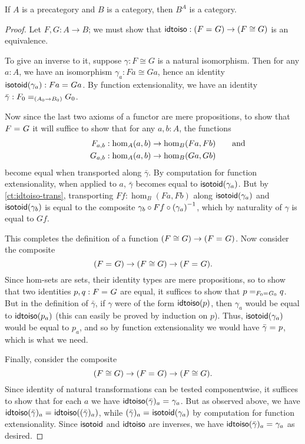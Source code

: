\begin{thm}\label{ct:functor-cat}
  If $A$ is a precategory and $B$ is a category, then $B^A$ is a category.
\end{thm}
\begin{proof}
  Let $F,G:A\to B$; we must show that $\idtoiso:(\id{F}{G}) \to (F\cong G)$ is an equivalence.

  To give an inverse to it, suppose $\gamma:F\cong G$ is a natural isomorphism.
  Then for any $a:A$, we have an isomorphism $\gamma_a:Fa \cong Ga$, hence an identity $\isotoid(\gamma_a):\id{Fa}{Ga}$.
  By function extensionality, we have an identity $\bar{\gamma}:\id[(A_0\to B_0)]{F_0}{G_0}$.

  Now since the last two axioms of a functor are mere propositions, to show that $\id{F}{G}$ it will suffice to show that for any $a,b:A$, the functions
  \begin{align*}
    F_{a,b}&:\hom_A(a,b) \to \hom_B(Fa,Fb)\mathrlap{\qquad\text{and}}\\
    G_{a,b}&:\hom_A(a,b) \to \hom_B(Ga,Gb)
  \end{align*}
  become equal when transported along $\bar\gamma$.
  By computation for function extensionality, when applied to $a$, $\bar\gamma$ becomes equal to $\isotoid(\gamma_a)$.
  But by \autoref{ct:idtoiso-trans}, transporting $Ff:\hom_B(Fa,Fb)$ along $\isotoid(\gamma_a)$ and $\isotoid(\gamma_b)$ is equal to the composite $\gamma_b\circ Ff\circ \inv{(\gamma_a)}$, which by naturality of $\gamma$ is equal to $Gf$.

  This completes the definition of a function $(F\cong G) \to (\id F G)$.
  Now consider the composite
  \[ (\id F G) \to (F\cong G) \to (\id F G). \]
  Since hom-sets are sets, their identity types are mere propositions, so to show that two identities $p,q:\id F G$ are equal, it suffices to show that $\id[\id{F_0}{G_0}]{p}{q}$.
  But in the definition of $\bar\gamma$, if $\gamma$ were of the form $\idtoiso(p)$, then $\gamma_a$ would be equal to $\idtoiso(p_a)$ (this can easily be proved by induction on $p$).
  Thus, $\isotoid(\gamma_a)$ would be equal to $p_a$, and so by function extensionality we would have $\id{\bar\gamma}{p}$, which is what we need.

  Finally, consider the composite
  \[(F\cong G)\to  (\id F G) \to (F\cong G). \]
  Since identity of natural transformations can be tested componentwise, it suffices to show that for each $a$ we have $\id{\idtoiso(\bar\gamma)_a}{\gamma_a}$.
  But as observed above, we have $\id{\idtoiso(\bar\gamma)_a}{\idtoiso((\bar\gamma)_a)}$, while $\id{(\bar\gamma)_a}{\isotoid(\gamma_a)}$ by computation for function extensionality.
  Since $\isotoid$ and $\idtoiso$ are inverses, we have $\id{\idtoiso(\bar\gamma)_a}{\gamma_a}$ as desired.
\end{proof}

